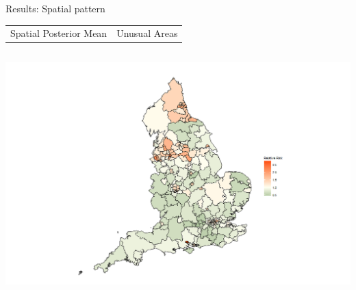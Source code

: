 \documentclass[slidestop,compress,serif,10pt]{beamer}
\begin{document}
\begin{frame}{Results: Spatial pattern}

\begin{tabular}{m{5cm}m{5cm}}
\footnotesize{Spatial Posterior Mean} & \hspace{30pt}\footnotesize{Unusual Areas}\\
\end{tabular}
\begin{columns}
\begin{column}{0.5\textwidth}               
\includegraphics[width=\textwidth]{RRmap}
\end{column}


\end{columns}
\end{frame}
\end{document}
